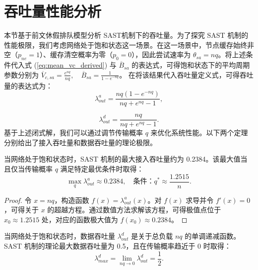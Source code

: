 \section{吞吐量性能分析}
\label{sec:throughput_analysis}

本节基于前文休假排队模型分析 SAST机制下的吞吐量。为了探究 SAST 机制的性能极限，我们考虑网络处于饱和状态这一场景。在这一场景中，节点缓存始终非空（$p_{ne}=1$）、缓存清空概率为零（$p_0=0$），因此尝试速率为 $\theta_{sa}=nq$。将上述条件代入式 (\ref{eq:mean_vc_derived}) 与 $\overline{B}_{sa}$ 的表达式，可得饱和状态下的平均周期参数分别为	$ \overline{V}_{c,sa} = \frac{e^{nq}}{nq}, \quad \overline{B}_{sa} = \frac{1}{1 - e^{-nq}} $。
在将该结果代入吞吐量定义式，可得吞吐量的表达式为：
\begin{equation}
	\label{eq:access_throughput_sa}
	\lambda_{out}^a = \frac{nq (1 - e^{-nq})}{nq + e^{nq} - 1},
\end{equation}

\begin{equation}
	\label{eq:data_throughput_sa}
	\lambda_{out}^d = \frac{nq}{nq + e^{nq} - 1}.
\end{equation}
基于上述闭式解，我们可以通过调节传输概率 $q$ 来优化系统性能。以下两个定理分别给出了接入吞吐量和数据吞吐量的理论极限。
\begin{theorem}[最大接入吞吐量]
	\label{thm:max_access_throughput}
	当网络处于饱和状态时，SAST 机制的最大接入吞吐量约为 0.2384。该最大值当且仅当传输概率 $q$ 满足特定最优条件时取得：
	\begin{equation}
		\max_{q} \lambda_{out}^a \approx 0.2384, \quad \text{条件：} q^* \approx \frac{1.2515}{n}.
	\end{equation}
\end{theorem}

\begin{proof}
	令 $x = nq$，构造函数 $f(x) = \lambda_{out}^a(x)$。对 $f(x)$ 求导并令 $f'(x) = 0$，可得关于 $x$ 的超越方程。通过数值方法求解该方程，可得极值点位于 $x_0 \approx 1.2515$ 处，对应的函数极大值为 $f(x_0) \approx 0.2384$。
\end{proof}
\begin{theorem}[最大数据吞吐量]
	\label{thm:max_data_throughput}
	当网络处于饱和状态时，数据吞吐量 $\lambda_{out}^d$ 是关于总负载 $nq$ 的单调递减函数。SAST 机制的理论最大数据吞吐量为 0.5，且在传输概率趋近于 0 时取得：
	\begin{equation}
		\lambda_{max}^d = \lim_{nq \to 0} \lambda_{out}^d = \frac{1}{2}.
	\end{equation}
\end{theorem}


